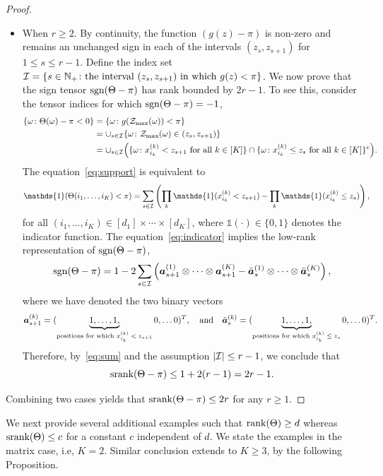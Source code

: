 \documentclass[11pt]{article}
\theoremstyle{plain}
\theoremstyle{definition}
\newcommand*{\KeepStyleUnderBrace}[1]{%
  \mathop{%
    \mathchoice
    {\underbrace{\displaystyle#1}}%
    {\underbrace{\textstyle#1}}%
    {\underbrace{\scriptstyle#1}}%
    {\underbrace{\scriptscriptstyle#1}}%
  }\limits
}
\def\sign{\textup{sgn}}
\def\srank{\textup{srank}}
\def\rank{\textup{rank}}
\begin{document}
\begin{proof}
\begin{itemize}[leftmargin=*,topsep=0pt,itemsep=-1ex,partopsep=1ex,parsep=1ex]
\item When $r\geq 2$.   By continuity, the function $(g(z)-\pi)$ is non-zero and remains an unchanged sign in each of the intervals $(z_s, z_{s+1})$ for $1\leq s\leq r-1$. Define the index set $\mathcal{I}=\{s\in\mathbb{N}_{+}\colon \text{the interval $(z_s, z_{s+1})$ in which $g(z)<\pi$}\}$. 
We now prove that the sign tensor $\sign(\Theta-\pi)$ has rank bounded by $2r-1$. To see this, consider the tensor indices for which $\sign(\Theta-\pi)=-1$,
\begin{align}\label{eq:support}
\{\omega\colon \Theta(\omega)-\pi <0 \} & = \{\omega \colon g(\mathcal{Z}_{\max}(\omega))<\pi\} \notag \\
&=\cup_{s\in \mathcal{I}} \{\omega\colon \mathcal{Z}_{\max}(\omega)\in(z_s,z_{s+1})\}\notag\\
&=\cup_{s\in \mathcal{I}}\Big( \{\omega\colon \text{$x^{(k)}_{i_k}< z_{s+1}$ for all $k\in[K]$}\}\cap \{\omega\colon \text{$x^{(k)}_{i_k}\leq z_{s}$ for all $k\in[K]$}\}^c\Big).
\end{align}
The equation~\eqref{eq:support} is equivalent to 
\begin{align}\label{eq:indicator}
\mathds{1}(\Theta(i_1,\ldots,i_K)< \pi)&
=\sum_{s\in \tI}\left( \prod_k \mathds{1}(x^{(k)}_{i_k}< z_{s+1}) - \prod_k \mathds{1}(x^{(k)}_{i_k}\leq z_{s})\right),
\end{align}
for all $(i_1,\ldots,i_K)\in[d_1]\times \cdots\times[d_K]$, where $\mathds{1}(\cdot)\in\{0,1\}$ denotes the indicator function. The equation~\eqref{eq:indicator} implies the low-rank representation of $\sign(\Theta-\pi)$,
\begin{equation}\label{eq:sum}
\sign(\Theta-\pi)=1-2\sum_{s\in \tI } \left(\ma^{(1)}_{s+1}\otimes\cdots\otimes \ma^{(K)}_{s+1} - \bar \ma^{(1)}_s\otimes\cdots\otimes \bar \ma^{(K)}_s\right),
\end{equation}
where we have denoted the two binary vectors 
\[
\ma^{(k)}_{s+1}=(\KeepStyleUnderBrace{1,\ldots,1,}_{\text{positions for which $x_{i_k}^{(k)}<z_{s+1}$}}0,\ldots 0)^T,\quad \text{and}\quad
\bar \ma^{(k)}_s=(\KeepStyleUnderBrace{1,\ldots,1,}_{\text{positions for which $x_{i_k}^{(k)}\leq z_{s}$}}0,\ldots 0)^T.
\]
Therefore, by~\eqref{eq:sum} and the assumption $|\mathcal{I}|\leq r-1$, we conclude that 
\[
\srank(\Theta-\pi)\leq 1+2(r-1)=2r-1.
\]
\end{itemize}
Combining two cases yields that $\srank(\Theta-\pi)\leq 2r$ for any $r\geq 1$.
\end{proof}

We next provide several additional examples such that $\rank(\Theta)\geq d$ whereas $\srank(\Theta)\leq c$ for a constant $c$ independent of $d$. We state the examples in the matrix case, i.e, $K=2$. Similar conclusion extends to $K\geq 3$, by the following Proposition. \\
\end{document}

